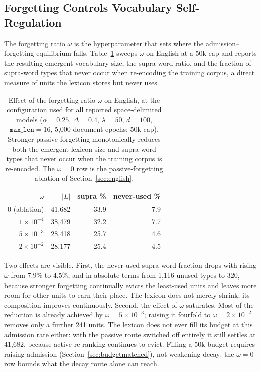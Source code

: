 \documentclass[pdflatex,sn-apa]{sn-jnl}
\begin{document}
\subsection{Forgetting Controls Vocabulary Self-Regulation}
\label{sec:forgetting-results}

The forgetting ratio $\omega$ is the hyperparameter that sets where the
admission--forgetting equilibrium falls.
Table~\ref{tab:omega} sweeps $\omega$ on English at a 50k cap and reports the
resulting emergent vocabulary size, the supra-word ratio, and the fraction of
supra-word types that never occur when re-encoding the training corpus, a
direct measure of units the lexicon stores but never uses.

\begin{table}[t]
\centering
\small
\begin{tabular}{rrrr}
\toprule
$\omega$ & \textbf{$|L|$} & \textbf{supra \%} & \textbf{never-used \%} \\
\midrule
$0$ (ablation)   & 41{,}682 & 33.9 & 7.9 \\
$1\times10^{-4}$ & 38{,}479 & 32.2 & 7.7 \\
$5\times10^{-3}$ & 28{,}418 & 25.7 & 4.6 \\
$2\times10^{-2}$ & 28{,}177 & 25.4 & 4.5 \\
\bottomrule
\end{tabular}
\caption{Effect of the forgetting ratio $\omega$ on English, at the
configuration used for all reported space-delimited models ($\alpha{=}0.25$,
$\Delta{=}0.4$, $\lambda{=}50$, $d{=}100$, $\texttt{max\_len}{=}16$,
5{,}000 document-epochs; 50k cap). Stronger passive forgetting monotonically
reduces both the emergent lexicon size and supra-word
types that never occur when the training corpus is re-encoded. The
$\omega{=}0$ row is the passive-forgetting ablation of
Section~\ref{sec:english}. %
}
\label{tab:omega}
\end{table}

Two effects are visible.
First, the never-used supra-word
fraction drops with rising $\omega$ from $7.9\%$ to $4.5\%$, and in absolute terms from 1{,}116
unused types to 320, because stronger forgetting continually evicts the
least-used units and leaves more room for other units to earn their place. The lexicon
does not merely shrink; its composition improves continuously.
Second, the effect of $\omega$ saturates. Most of the reduction is already
achieved by $\omega=5\times10^{-3}$; raising it fourfold to
$\omega=2\times10^{-2}$ removes only a further 241 units. The lexicon
does not ever fill its budget at this admission rate either: with the passive route switched
off entirely it still settles at 41{,}682, because active re-ranking continues
to evict. Filling a 50k budget requires raising admission
(Section~\ref{sec:budgetmatched}), not weakening decay: the $\omega=0$ row
bounds what the decay route alone can reach.
\end{document}
